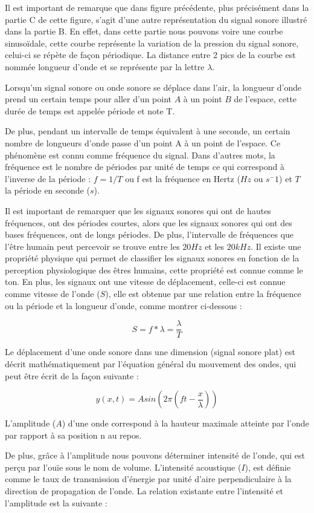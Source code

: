 \documentclass[conference,onecolumn]{IEEEtran}
\begin{document}
Il est important de remarque que dans figure précédente, plus précisément dans la partie C de cette figure, s’agit d’une autre représentation du signal sonore illustré dans la partie B. En effet, dans cette partie nous pouvons voire une courbe sinusoïdale, cette courbe représente la variation de la pression du signal sonore, celui-ci se répète de façon périodique. La distance entre 2 pics de la courbe est nommée longueur d’onde et se représente par la lettre $\lambda$. 

Lorsqu’un signal sonore ou onde sonore se déplace dans l’air, la longueur d’onde prend un certain temps pour aller d’un point $A$ à un point $B$ de l’espace, cette durée de temps est appelée période et note T. 

De plus, pendant un intervalle de temps équivalent à une seconde, un certain nombre de longueurs d’onde passe d’un point A à un point de l’espace. Ce phénomène est connu comme fréquence du signal. Dans d’autres mots, la fréquence est le nombre de périodes par unité de temps ce qui correspond à l’inverse de la période : $f=1/T$ ou f est la fréquence en Hertz ($Hz$ ou $s^-1$) et $T$ la période en seconde ($s$). 

Il est important de remarquer que les signaux sonores qui ont de hautes fréquences, ont des périodes courtes, alors que les signaux sonores qui ont des bases fréquences, ont de longs périodes. De plus, l’intervalle de fréquences que l’être humain peut percevoir se trouve entre les $20Hz$ et les $20 kHz$. Il existe une propriété physique qui permet de classifier les signaux sonores en fonction de la perception physiologique des êtres humains, cette propriété est connue comme le ton. En plus, les signaux ont une vitesse de déplacement, celle-ci est connue comme vitesse de l’onde ($S$), elle est obtenue par une relation entre la fréquence ou la période et la longueur d’onde, comme montrer ci-dessous : 

\[S = f*\lambda = \dfrac{\lambda}{T}\]

Le déplacement d’une onde sonore dans une dimension (signal sonore plat) est décrit mathématiquement par l’équation général du mouvement des ondes, qui peut être écrit de la façon suivante :  
 
\[y(x,t) = Asin(2\pi(ft - \dfrac{x}{\lambda}))\]

L'amplitude ($A$) d'une onde correspond à la hauteur maximale atteinte par l'onde par rapport à sa position n au repos. 

De plus, grâce à l’amplitude nous pouvons déterminer intensité de l’onde, qui est perçu par l’ouïe sous le nom de volume. L'intensité acoustique ($I$), est définie comme le taux de transmission d'énergie par unité d’aire perpendiculaire à la direction de propagation de l’onde. La relation existante entre l’intensité et l’amplitude est la suivante : 
\end{document}
